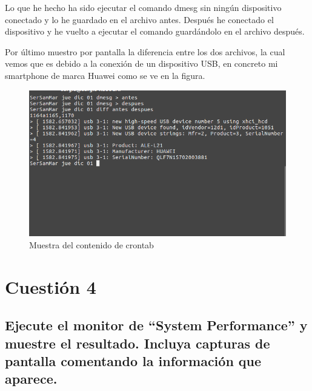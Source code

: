 Lo que he hecho ha sido ejecutar el comando dmesg sin ningún dispositivo conectado y lo he guardado en el archivo antes.
Después he conectado el dispositivo y he vuelto a ejecutar el comando guardándolo en el archivo después.

Por último muestro por pantalla la diferencia entre los dos archivos, la cual vemos que es debido a la conexión de un dispositivo USB, en concreto mi smartphone de marca Huawei como se ve en la figura.

\begin{figure}[H] %
	\centering
	\includegraphics[scale=0.5]{imagenes/dmesg.png}  %
	\caption{Muestra del contenido de crontab}
\end{figure}

\section{Cuestión 4}
\subsection{\Large Ejecute el monitor de “System Performance” y muestre el resultado. Incluya capturas de pantalla comentando la información que aparece.}

